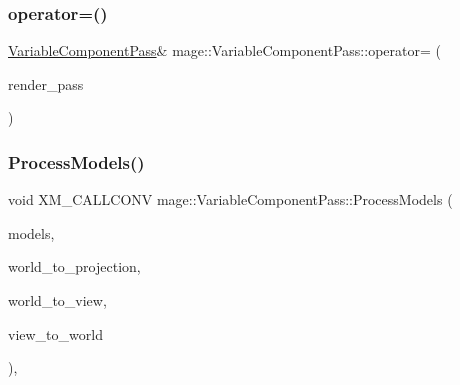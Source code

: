 \subsubsection{\texorpdfstring{operator=()}{operator=()}\hspace{0.1cm}{\footnotesize\ttfamily [2/2]}}
{\footnotesize\ttfamily \hyperlink{classmage_1_1_variable_component_pass}{Variable\+Component\+Pass}\& mage\+::\+Variable\+Component\+Pass\+::operator= (\begin{DoxyParamCaption}\item[{\hyperlink{classmage_1_1_variable_component_pass}{Variable\+Component\+Pass} \&\&}]{render\+\_\+pass }\end{DoxyParamCaption})\hspace{0.3cm}{\ttfamily [delete]}}

\hypertarget{classmage_1_1_variable_component_pass_ab231c4d3a7992b3a11b17ecc12fb5fda}{}\label{classmage_1_1_variable_component_pass_ab231c4d3a7992b3a11b17ecc12fb5fda} 
\subsubsection{\texorpdfstring{Process\+Models()}{ProcessModels()}}
{\footnotesize\ttfamily void X\+M\+\_\+\+C\+A\+L\+L\+C\+O\+NV mage\+::\+Variable\+Component\+Pass\+::\+Process\+Models (\begin{DoxyParamCaption}\item[{const vector$<$ const \hyperlink{classmage_1_1_model_node}{Model\+Node} $\ast$ $>$ \&}]{models,  }\item[{F\+X\+M\+M\+A\+T\+R\+IX}]{world\+\_\+to\+\_\+projection,  }\item[{F\+X\+M\+M\+A\+T\+R\+IX}]{world\+\_\+to\+\_\+view,  }\item[{F\+X\+M\+M\+A\+T\+R\+IX}]{view\+\_\+to\+\_\+world }\end{DoxyParamCaption})\hspace{0.3cm}{\ttfamily [private]}, {\ttfamily [noexcept]}}

\hypertarget{classmage_1_1_variable_component_pass_a012b74d72c3755b732d21f857f85a246}{}\label{classmage_1_1_variable_component_pass_a012b74d72c3755b732d21f857f85a246} 
